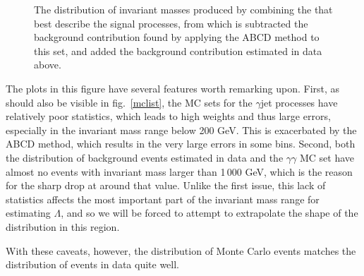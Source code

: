 \begin{figure}[htp]
\begin{minipage}[b]{\textwidth}
\begin{infilsf} \tiny

\end{infilsf}
\end{minipage}

\begin{minipage}[b]{\textwidth}
\caption{The distribution of invariant masses produced by combining the \atlas{} that best describe the signal processes, from which is subtracted the background contribution found by applying the ABCD method to this set, and added the background contribution estimated in data above. }\label{atlasmc}
\end{minipage}
\end{figure}

The plots in this figure have several features worth remarking upon. First, as should also be visible in fig.~\ref{mclist}, the MC sets for the $\gamma$jet processes have relatively poor statistics, which leads to high weights and thus large errors, especially in the invariant mass range below 200 GeV. This is exacerbated by the ABCD method, which results in the very large errors in some bins. Second, both the distribution of background events estimated in data and the $\gamma\gamma$ MC set have almost no events with invariant mass larger than 1\,000 GeV, which is the reason for the sharp drop at around that value. Unlike the first issue, this lack of statistics affects the most important part of the invariant mass range for estimating $\Lambda$, and so we will be forced to attempt to extrapolate the shape of the distribution in this region.

With these caveats, however, the distribution of Monte Carlo events matches the distribution of events in data quite well.






